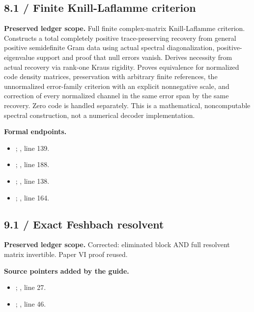 \subsection{8.1 / Finite Knill-Laflamme criterion}
\label{result:8.1}
\textbf{Preserved ledger scope.} Full finite complex-matrix Knill-Laflamme criterion. Constructs a total completely positive trace-preserving recovery from general positive semidefinite Gram data using actual spectral diagonalization, positive-eigenvalue support and proof that null errors vanish. Derives necessity from actual recovery via rank-one Kraus rigidity. Proves equivalence for normalized code density matrices, preservation with arbitrary finite references, the unnormalized error-family criterion with an explicit nonnegative scale, and correction of every normalized channel in the same error span by the same recovery. Zero code is handled separately. This is a mathematical, noncomputable spectral construction, not a numerical decoder implementation.

\textbf{Formal endpoints.}\begin{itemize}
\item {}; , line 139.
\item {}; , line 188.
\item {}; , line 138.
\item {}; , line 164.
\end{itemize}
\subsection{9.1 / Exact Feshbach resolvent}
\label{result:9.1}
\textbf{Preserved ledger scope.} Corrected: eliminated block AND full resolvent matrix invertible. Paper VI proof reused.

\textbf{Source pointers added by the guide.}\begin{itemize}
\item {}; , line 27.
\item {}; , line 46.
\end{itemize}
